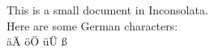 \documentclass{article}
\begin{document}
This is a small document in Inconsolata.
\\
Here are some German characters:
\\
äÄ öÖ üÜ ß
\end{document}
